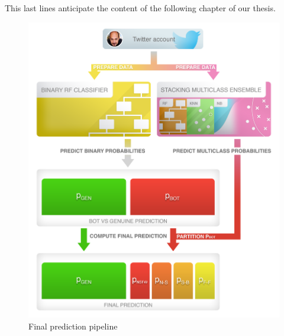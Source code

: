 This last lines anticipate the content of the following chapter of our thesis.
\begin{figure}
	\begin{center}
		\includegraphics[width=\columnwidth]{chapter5/figure/pred_pipeline.png}\par 
	\end{center}
	\caption{Final prediction pipeline}
	\label{fig:prediction_pipeline}
\end{figure}